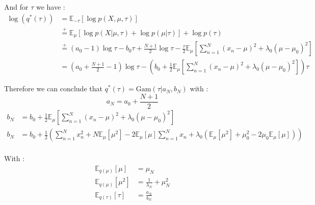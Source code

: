 \documentclass{article}
\begin{document}
And for $\tau$ we have :
\begin{equation}
    \begin{split}
        \log(q^*(\tau)) & = \mathbb{E}_{-\tau}[\log p(X, \mu, \tau)]                                                                                                                             \\
                        & \overset{+}{=} \mathbb{E}_\mu[\log p(X|\mu, \tau) + \log p(\mu|\tau)] + \log p(\tau)                                                                                   \\
                        & \overset{+}{=} (a_0 - 1)\log \tau - b_0\tau + \frac{N+1}{2}\log \tau - \frac{\tau}{2}\mathbb{E}_\mu\left[\sum_{n=1}^{N}(x_n - \mu)^2 + \lambda_0(\mu - \mu_0)^2\right] \\
                        & = (a_0 + \frac{N+1}{2} - 1)\log \tau - \left(b_0 + \frac{1}{2}\mathbb{E}_\mu\left[\sum_{n=1}^{N}(x_n - \mu)^2 + \lambda_0(\mu - \mu_0)^2\right]\right)\tau
    \end{split}
\end{equation}

Therefore we can conclude that $q^*(\tau) = \text{Gam}(\tau|a_N, b_N)$ with :
\begin{equation}
    a_N = a_0 + \frac{N+1}{2}
\end{equation}
\begin{equation}
    \begin{split}
        b_N & = b_0 + \frac{1}{2}\mathbb{E}_\mu\left[\sum_{n=1}^{N}(x_n - \mu)^2 + \lambda_0(\mu - \mu_0)^2\right]                                                                                                     \\
        b_N & = b_0 + \frac{1}{2}\left(\sum_{n=1}^{N}x_n^2 + N\mathbb{E}_\mu[\mu^2] - 2\mathbb{E}_\mu[\mu]\sum_{n=1}^{N}x_n + \lambda_0\left(\mathbb{E}_\mu[\mu^2] + \mu_0^2 - 2\mu_0\mathbb{E}_\mu[\mu]\right)\right) \\
    \end{split}
\end{equation}

With :
\begin{equation}
    \begin{split}
        \mathbb{E}_{q(\mu)}[\mu]   & = \mu_N                         \\
        \mathbb{E}_{q(\mu)}[\mu^2] & = \frac{1}{\lambda_N} + \mu_N^2 \\
        \mathbb{E}_{q(\tau)}[\tau] & = \frac{a_N}{b_N}
    \end{split}
\end{equation}
\end{document}
